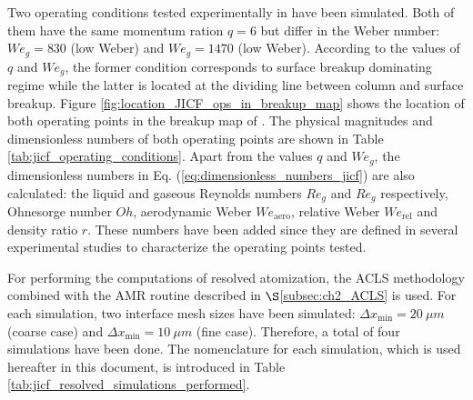 Two operating conditions tested experimentally in  have been simulated. Both of them have the same momentum ration $q = 6$ but differ in the Weber number: $We_g = 830$ (low Weber) and $We_g = 1470$ (low Weber). According to the values of $q$ and $We_g$, the former condition corresponds to surface breakup dominating regime while the latter is located at the dividing line between column and surface breakup. Figure \ref{fig:location_JICF_ops_in_breakup_map} shows the location of both operating points in the breakup map of \citeColor[wu_breakup_1997]. The physical magnitudes and dimensionless numbers of both operating points are shown in Table \ref{tab:jicf_operating_conditions}. Apart from the values $q$ and $We_g$, the dimensionless numbers in  Eq. (\ref{eq:dimensionless_numbers_jicf}) are also calculated: the liquid and gaseous Reynolds numbers $Re_g$ and $Re_g$ respectively, Ohnesorge number $Oh$, aerodynamic Weber $We_\mathrm{aero}$, relative Weber $We_\mathrm{rel}$ and density ratio $r$. These numbers have been added since they are defined in several experimental studies  to characterize the operating points tested. 

For performing the computations of resolved atomization, the ACLS methodology combined with the AMR routine described in $\S$\ref{subsec:ch2_ACLS} is used. For each simulation, two interface mesh sizes have been simulated: $\Delta x_\mathrm{min} = 20 ~\mu m$ (coarse case) and $\Delta x_\mathrm{min} = 10 ~\mu m$ (fine case). Therefore, a total of four simulations have been done. The nomenclature for each simulation, which is used hereafter in this document, is introduced in Table \ref{tab:jicf_resolved_simulations_performed}.


